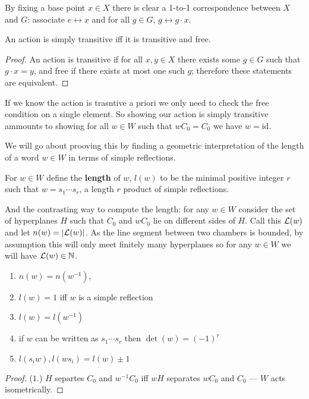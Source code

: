 \documentclass[../main.tex]{subfiles}
\begin{document}
By fixing a base point $x\in X$ there is clear a 1-to-1 correspondence between $X$ and $G$: associate $e\leftrightarrow x$ and for all $g\in G$, $g\leftrightarrow g\cdot x$.

\begin{proposition}
    An action is simply transitive iff it is transitive and free.
    \begin{proof}
        An action is transitive if for all $x,y\in X$ there exists some $g\in G$ such that $g\cdot x = y$, and free if there exists at most one such $g$; therefore these statements are equivalent.
    \end{proof}
\end{proposition}

If we know the action is trasntive a priori we only need to check the free condition on a single element. So showing our action is simply transitive ammounts to showing for all $w\in W$ such that $wC_0 = C_0$ we have $w=\text{id}$.

We will go about prooving this by finding a geometric interpretation of the length of a word $w\in W$ in terms of simple reflections.

\begin{definition}
    For $w\in W$ define the \textbf{length} of $w$, $l(w)$ to be the minimal positive integer $r$ such that $w=s_1\cdots s_r$, a length $r$ product of simple reflections.
\end{definition}

And the contrasting way to compute the length: for any $w\in W$ consider the set of hyperplanes $H$ such that $C_0$ and $wC_0$ lie on different sides of $H$. Call this $\mathcal{L}(w)$ and let $n(w) = |\mathcal{L}(w)|$. As the line segment between two chambers is bounded, by assumption this will only meet finitely many hyperplanes so for any $w\in W$ we will have $\mathcal{L}(w)\in \mathbb{N}$.

\begin{lemma}
    \begin{enumerate}
        \item $n(w) = n(w^{-1})$,
        \item $l(w) = 1$ iff $w$ is a simple reflection
        \item $l(w) = l(w^{-1})$
        \item if $w$ can be written as $s_1\cdots s_r$ then $\det(w) = (-1)^r$
        \item $l(s_i w),l(w s_i) = l(w) \pm 1$
    \end{enumerate}
    \begin{proof}
        ($1.$) $H$ separtes $C_0$ and $w^{-1}C_0$ iff $wH$ separates $wC_0$ and $C_0$ --- $W$ acts isometrically.
    \end{proof}
\end{lemma}
\end{document}
